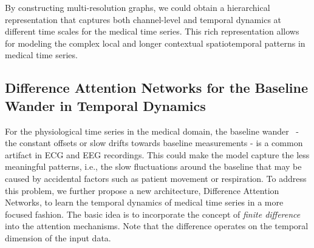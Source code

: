 By constructing multi-resolution graphs, we could obtain a hierarchical representation that captures both channel-level and temporal dynamics at different time scales for the medical time series. This rich representation allows for modeling the complex local and longer contextual spatiotemporal patterns in medical time series.

\vspace{-2mm}
\subsection{Difference Attention Networks for the Baseline Wander in Temporal Dynamics}\label{sec:2}
For the physiological time series in the medical domain, the baseline wander~\cite{MoyYSAA21} - the constant offsets or slow drifts towards baseline measurements - is a common artifact in ECG and EEG recordings. This could make the model capture the less meaningful patterns, i.e., the slow fluctuations around the baseline that may be caused by  accidental factors such as patient movement or respiration. To address this problem, we further propose a new architecture, Difference Attention Networks, to learn the temporal dynamics of medical time series in a more focused fashion. The basic idea is to incorporate the concept of \textit{finite difference} into the attention mechanisms. Note that the difference operates on the temporal dimension  of the input data. 

